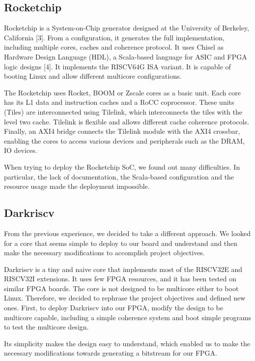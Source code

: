 \subsection{Rocketchip}
Rocketchip is a System-on-Chip generator designed at the University of Berkeley, California [3]. From a configuration, it generates the full implementation, including multiple cores, caches and coherence protocol. It uses Chisel as Hardware Design Language (HDL), a Scala-based language for ASIC and FPGA logic designs [4]. It implements the RISCV64G ISA variant. It is capable of booting Linux and allow different multicore configurations.

The Rocketchip uses Rocket, BOOM or Zscale cores as a basic unit. Each core has its L1 data and instruction caches and a RoCC coprocessor. These units (Tiles) are interconnected using Tilelink, which interconnects the tiles with the level two cache. Tilelink is flexible and allows different cache coherence protocols. Finally, an AXI4 bridge connects the Tilelink module with the AXI4 crossbar, enabling the cores to access various devices and peripherals such as the DRAM, IO devices.

When trying to deploy the Rocketchip SoC, we found out many difficulties. In particular, the lack of documentation, the Scala-based configuration and the resource usage made the deployment impossible.

\subsection{Darkriscv}
From the previous experience, we decided to take a different approach. We looked for a core that seems simple to deploy to our board and understand and then make the necessary modifications to accomplish project objectives.

Darkriscv is a tiny and naive core that implements most of the RISCV32E and RISCV32I extensions. It uses few FPGA resources, and it has been tested on similar FPGA boards. The core is not designed to be multicore either to boot Linux. Therefore, we decided to rephrase the project objectives and defined new ones. First, to deploy Darkriscv into our FPGA, modify the design to be multicore capable, including a simple coherence system and boot simple programs to test the multicore design.

Its simplicity makes the design easy to understand, which enabled us to make the necessary modifications towards generating a bitstream for our FPGA.

